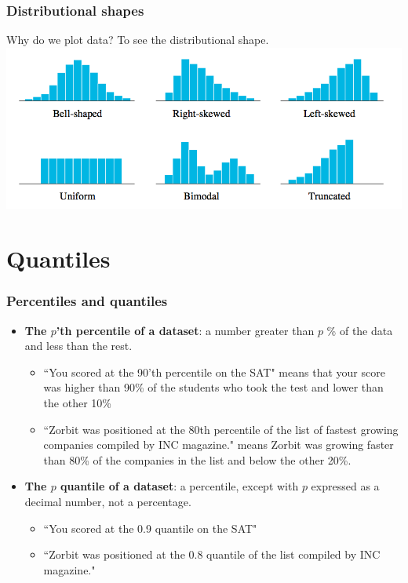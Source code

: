 \documentclass[handout]{beamer}
\providecommand{\q}{$\quad$ \newline}
\numberwithin{equation}{section}
\begin{document}
\begin{frame}
\frametitle{Distributional shapes}
Why do we plot data? To see the distributional shape. \q
{} \includegraphics{../../fig/distshapes.png}
\end{frame}

\section{Quantiles}

\begin{frame}
\frametitle{Percentiles and quantiles}
\begin{itemize}
\item {\bf The $p$'th percentile of a dataset}: a number greater than $p$ \% of the data and less than the rest.
\begin{itemize}
\pause \item ``You scored at the 90'th percentile on the SAT" means that your score was higher than 90\% of the students who took the test and lower than the other 10\%
\pause \item ``Zorbit was positioned at the 80th percentile of the list of fastest growing companies compiled by INC magazine." means Zorbit was growing faster than 80\% of the companies in the list and below the other 20\%.
\end{itemize}
\pause \item {\bf The $p$ quantile of a dataset}: a percentile, except with $p$ expressed as a decimal number, not a percentage.
\begin{itemize}
\pause \item ``You scored at the 0.9 quantile on the SAT"
\pause \item ``Zorbit was positioned at the 0.8 quantile of the list compiled by INC magazine."
\end{itemize}
\end{itemize}
\end{frame}
\end{document}
